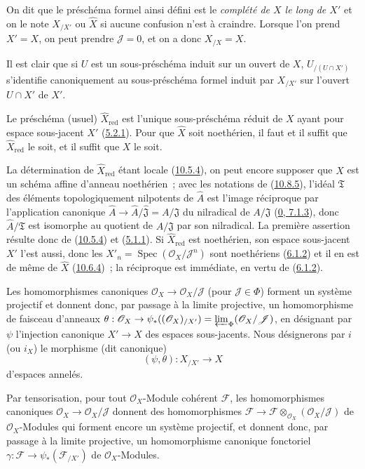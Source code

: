 On dit que le préschéma formel ainsi défini est le
\emph{complété de $X$ le long de $X'$} et on le note $X_{/X'}$ ou
$\widehat X$ si aucune confusion n'est à craindre. Lorsque l'on prend
$X'=X$, on peut prendre $\mathscr{J}=0$, et on a donc $X_{/X}=X$.

Il est clair que si $U$ est un sous-préschéma induit sur un ouvert de $X$,
$U_{/(U\cap X')}$ s'identifie canoniquement au sous-préschéma formel induit
par $X_{/X'}$ sur l'ouvert $U\cap X'$ de $X'$.

\begin{corollary}[10.8.6]
\label{I.10.8.6-fr}
Le préschéma (usuel) $\widehat X_{\mathrm{red}}$ est l'unique
sous-préschéma réduit de $X$ ayant pour espace sous-jacent $X'$
(\hyperref[I.5.2.1-fr]{5.2.1}). Pour que $\widehat X$ soit noethérien, il
faut et il suffit que $\widehat X_{\mathrm{red}}$ le soit, et il suffit que
$X$ le soit.
\end{corollary}


La détermination de $\widehat X_{\mathrm{red}}$ étant locale
(\hyperref[I.10.5.4-fr]{10.5.4}), on peut encore supposer que $X$ est un
schéma affine d'anneau noethérien~; avec les notations de
(\hyperref[I.10.8.5-fr]{10.8.5}), l'idéal $\mathfrak{T}$ des éléments
topologiquement nilpotents de $\widehat A$ est l'image réciproque par
l'application canonique
$\widehat A\to\widehat A/\widehat{\mathfrak{J}}=A/\mathfrak{J}$ du
nilradical de $A/\mathfrak{J}$
(\hyperref[0.7.1.3-fr]{0, 7.1.3}), donc $\widehat A/\mathfrak{T}$ est
isomorphe au quotient de $A/\mathfrak{J}$ par son nilradical. La première
assertion résulte donc de (\hyperref[I.10.5.4-fr]{10.5.4}) et
(\hyperref[I.5.1.1-fr]{5.1.1}). Si $\widehat X_{\mathrm{red}}$ est
noethérien, son espace sous-jacent $X'$ l'est aussi, donc les
$X'_n=\operatorname{Spec}(\mathscr{O}_X/\mathscr{J}^n)$ sont noethériens
(\hyperref[I.6.1.2-fr]{6.1.2}) et il en est de même de $\widehat X$
(\hyperref[I.10.6.4-fr]{10.6.4})~; la réciproque est immédiate, en vertu
de (\hyperref[I.6.1.2-fr]{6.1.2}).

\begin{env}[10.8.7]
\label{I.10.8.7-fr}
Les homomorphismes canoniques
$\mathscr{O}_X\to\mathscr{O}_X/\mathscr{J}$ (pour
$\mathscr{J}\in\Phi$) forment un système projectif et donnent donc, par
passage à la limite projective, un homomorphisme de faisceau d'anneaux
$\theta:\mathscr{O}_X\to\psi_*((\mathscr{O}_X)_{/X'})
=\varprojlim_\Phi(\mathscr{O}_X/\mathscr{J})$, en désignant par $\psi$
l'injection canonique $X'\to X$ des espaces sous-jacents. Nous désignerons
par $i$ (ou $i_X$) le morphisme (dit canonique)
\[
  (\psi,\theta):X_{/X'}\to X
\]
d'espaces annelés.

Par tensorisation, pour tout $\mathscr{O}_X$-Module cohérent
$\mathscr{F}$, les homomorphismes canoniques
$\mathscr{O}_X\to\mathscr{O}_X/\mathscr{J}$ donnent des homomorphismes
$\mathscr{F}\to
\mathscr{F}\otimes_{\mathscr{O}_X}(\mathscr{O}_X/\mathscr{J})$ de
$\mathscr{O}_X$-Modules qui forment encore un système projectif, et
donnent donc, par passage à la limite projective, un homomorphisme
canonique fonctoriel
$\gamma:\mathscr{F}\to\psi_*(\mathscr{F}_{/X'})$ de
$\mathscr{O}_X$-Modules.
\end{env}

